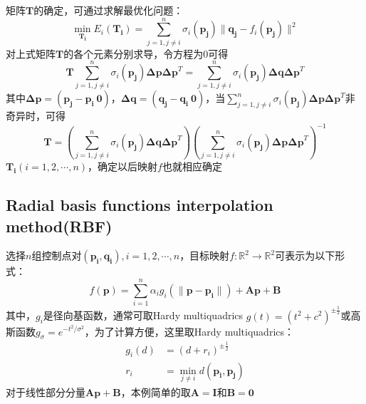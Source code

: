 \documentclass[14pt]{scrartcl} %
\begin{document}
	矩阵$\boldsymbol{T}$的确定，可通过求解最优化问题：
	\begin{equation}
		\min\limits_{\boldsymbol{T_i}} E_i(\boldsymbol{T_i})=\sum\limits^n_{j=1,j\neq i}\sigma_i(\boldsymbol{p_j})\|\boldsymbol{q_j}-f_i(\boldsymbol{p_j})\|^2
	\end{equation}
	对上式矩阵$\boldsymbol{T}$的各个元素分别求导，令方程为0可得
	\begin{equation}
		\boldsymbol{T}\sum\limits^n_{j=1,j\neq i}\sigma_i(\boldsymbol{p_j})\boldsymbol{\Delta p}\boldsymbol{\Delta p}^T =\sum\limits^n_{j=1,j\neq i}\sigma_i(\boldsymbol{p_j})\boldsymbol{\Delta q}\boldsymbol{\Delta p}^T
	\end{equation}
	其中$\boldsymbol{\Delta p}=(\boldsymbol{p_j}-\boldsymbol{p_i}\ \boldsymbol{0})$，$\boldsymbol{\Delta q}=(\boldsymbol{q_j}-\boldsymbol{q_i}\ \boldsymbol{0})$，当$\sum\limits^n_{j=1,j\neq i}\sigma_i(\boldsymbol{p_j})\boldsymbol{\Delta p}\boldsymbol{\Delta p}^T$非奇异时，可得
	\begin{equation}
		\boldsymbol{T}= (\sum\limits^n_{j=1,j\neq i}\sigma_i(\boldsymbol{p_j})\boldsymbol{\Delta q}\boldsymbol{\Delta p}^T)(\sum\limits^n_{j=1,j\neq i}\sigma_i(\boldsymbol{p_j})\boldsymbol{\Delta p}\boldsymbol{\Delta p}^T)^{-1}
	\end{equation}
	$\boldsymbol{T_i}(i=1,2,\cdots,n)$，确定以后映射$f$也就相应确定
	
	\subsection{Radial basis functions interpolation method(RBF)\cite{arad1995image}}
	选择$n$组控制点对$(\boldsymbol{p_i},\boldsymbol{q_i}),i=1,2,\cdots,n$，目标映射$f:\mathbb{R}^2\rightarrow \mathbb{R}^2$可表示为以下形式：
	\begin{equation}
		f(\boldsymbol{p})=\sum\limits_{i=1}^n\alpha_i g_i(\|\boldsymbol{p}-\boldsymbol{p_i}\|)+\boldsymbol{A}\boldsymbol{p}+\boldsymbol{B}
	\end{equation}
	其中，$g_i$是径向基函数，通常可取Hardy multiquadrics $g(t)=(t^2+c^2)^{\pm\frac{1}{2}}$或高斯函数$g_\sigma=e^{-t^2/\sigma^2}$，为了计算方便，这里取Hardy multiquadrics：
	\begin{equation}
		\begin{aligned}
			g_i(d) & =(d+r_i)^{\pm\frac{1}{2}}\\
			r_i & =\mathop{\min}\limits_{j\neq i} d(\boldsymbol{p_i},\boldsymbol{p_j})
		\end{aligned}
	\end{equation}
	对于线性部分分量$\boldsymbol{A}\boldsymbol{p}+\boldsymbol{B}$，本例简单的取$\boldsymbol{A}=\boldsymbol{I}$和$\boldsymbol{B}=\boldsymbol{0}$
	
\end{document}
